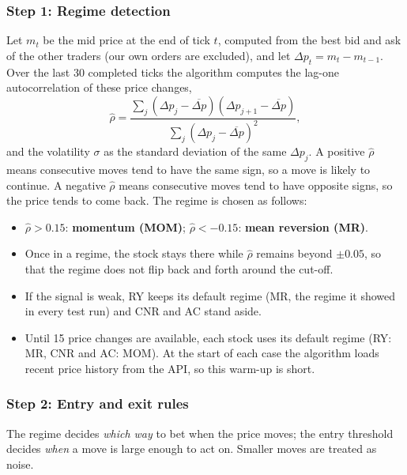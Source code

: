 \documentclass{article}
\begin{document}
\subsubsection*{Step 1: Regime detection}

Let $m_t$ be the mid price at the end of tick $t$, computed from the best bid and ask of the other traders (our own orders are excluded), and let $\Delta p_t = m_t - m_{t-1}$. Over the last 30 completed ticks the algorithm computes the lag-one autocorrelation of these price changes,
\begin{equation}
\hat\rho = \frac{\sum_{j} (\Delta p_j - \overline{\Delta p})(\Delta p_{j+1} - \overline{\Delta p})}{\sum_{j} (\Delta p_j - \overline{\Delta p})^2 },
\end{equation}
and the volatility $\sigma$ as the standard deviation of the same $\Delta p_j$. A positive $\hat\rho$ means consecutive moves tend to have the same sign, so a move is likely to continue. A negative $\hat\rho$ means consecutive moves tend to have opposite signs, so the price tends to come back. The regime is chosen as follows:
\begin{itemize}
  \item $\hat\rho > 0.15$: \textbf{momentum (MOM)}; $\hat\rho < -0.15$: \textbf{mean reversion (MR)}.
  \item Once in a regime, the stock stays there while $\hat\rho$ remains beyond $\pm 0.05$, so that the regime does not flip back and forth around the cut-off.
  \item If the signal is weak, RY keeps its default regime (MR, the regime it showed in every test run) and CNR and AC stand aside.
  \item Until 15 price changes are available, each stock uses its default regime (RY: MR, CNR and AC: MOM). At the start of each case the algorithm loads recent price history from the API, so this warm-up is short.
\end{itemize}

\subsubsection*{Step 2: Entry and exit rules}

The regime decides \emph{which way} to bet when the price moves; the entry threshold decides \emph{when} a move is large enough to act on. Smaller moves are treated as noise.
\end{document}
